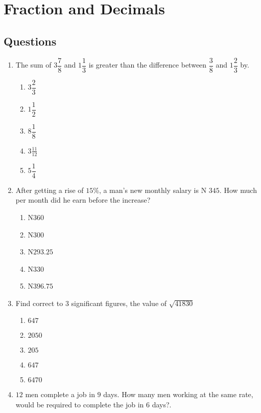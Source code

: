 \section{Fraction and Decimals}
\subsection{Questions}
\begin{multicols}{2}
\begin{enumerate}[label={\arabic*.}]
\item The sum of \(3 {\dfrac {7}{8}}\) and \(1{\dfrac{1}{3}}\) is greater than the difference between \(\dfrac {3}{8}\) and \(1{\dfrac{2}{3}}\) by.
    \begin{enumerate}[label={\Alph*.}]
    \item \(3\dfrac{2}{3}\)
    \item \(1\dfrac{1}{2}\)
    \item \(8\dfrac{1}{8}\)
    \item \(3\frac{11}{12}\)
    \item \(5\dfrac{1}{4}\)
    \end{enumerate}
\item  After getting a rise of \(15\%\), a man's new monthly salary is N \(345\). How much per month did he earn before the increase? 
    \begin{enumerate}[label={\Alph*.}]
    \item N\(360\)
    \item N\(300\)
    \item N\(293.25\)
    \item N\(330\)
    \item N\(396.75\)
    \end{enumerate}
\item Find correct to \(3\) significant figures, the value of \(\sqrt{41830}\)
    \begin{enumerate}[label={\Alph*.}]
    \item \(647\)
    \item \(2050\)
    \item \(205\)
    \item \(647\)
    \item \(6470\)
    \end{enumerate}
\item \(12\) men complete a job in \(9\) days. How many men working at the same rate, would be required to complete the job in \(6\) days?. 
    \begin{enumerate}[label={\Alph*.}]

\end{enumerate}
\end{enumerate}
\end{multicols}
